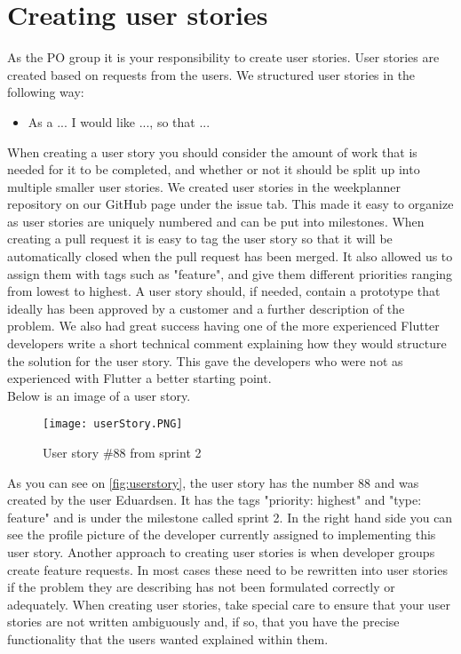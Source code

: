 \section{Creating user stories}
As the PO group it is your responsibility to create user stories.
User stories are created based on requests from the users.
We structured user stories in the following way:
\begin{itemize}
    \item As a ... I would like ..., so that ...
\end{itemize}

When creating a user story you should consider the amount of work that is needed for it to be completed, and whether or not it should be split up into multiple smaller user stories.
We created user stories in the weekplanner repository on our GitHub page under the issue tab.
This made it easy to organize as user stories are uniquely numbered and can be put into milestones.
When creating a pull request it is easy to tag the user story so that it will be automatically closed when the pull request has been merged.
It also allowed us to assign them with tags such as "feature", and give them different priorities ranging from lowest to highest.
A user story should, if needed, contain a prototype that ideally has been approved by a customer and a further description of the problem.
We also had great success having one of the more experienced Flutter developers write a short technical comment explaining how they would structure the solution for the user story.
This gave the developers who were not as experienced with Flutter a better starting point.
\\
Below is an image of a user story.
\begin{figure}[h]
    \centering
    \texttt{[image: userStory.PNG]}
    \caption{User story \#88 from sprint 2}
    \label{fig:userstory}
\end{figure}
As you can see on \autoref{fig:userstory}, the user story has the number 88 and was created by the user Eduardsen.
It has the tags "priority: highest" and "type: feature" and is under the milestone called sprint 2.
In the right hand side you can see the profile picture of the developer currently assigned to implementing this user story.
Another approach to creating user stories is when developer groups create feature requests.
In most cases these need to be rewritten into user stories if the problem they are describing has not been formulated correctly or adequately.
When creating user stories, take special care to ensure that your user stories are not written ambiguously and, if so, that you have the precise functionality that the users wanted explained within them.

